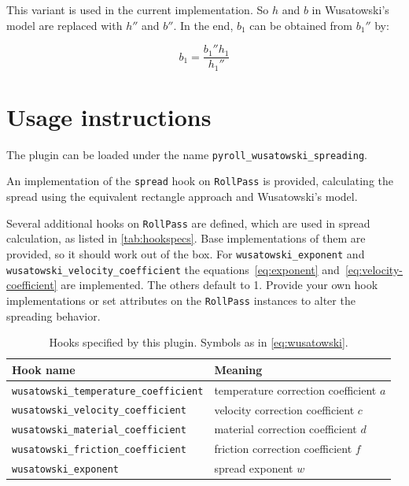 \documentclass[11pt]{PyRollDocs}
\begin{document}
    This variant is used in the current implementation.
    So $h$ and $b$ in Wusatowski's model are replaced with $h''$ and $b''$.
    In the end, $b_1$ can be obtained from $b_1''$ by:

    \[
        b_1 = \frac{b_1'' h_1}{h_1''}
    \]


    \section{Usage instructions}\label{sec:usage-instructions}

    The plugin can be loaded under the name \texttt{pyroll\_wusatowski\_spreading}.

    An implementation of the \lstinline{spread} hook on \lstinline{RollPass} is provided,
    calculating the spread using the equivalent rectangle approach and Wusatowski's model.

    Several additional hooks on \lstinline{RollPass} are defined, which are used in spread calculation, as listed in \autoref{tab:hookspecs}.
    Base implementations of them are provided, so it should work out of the box.
    For \lstinline{wusatowski_exponent} and \lstinline{wusatowski_velocity_coefficient} the equations~\ref{eq:exponent} and~\ref{eq:velocity-coefficient} are implemented.
    The others default to \num{1}.
    Provide your own hook implementations or set attributes on the \lstinline{RollPass} instances to alter the spreading behavior.

    \begin{table}
        \centering
        \caption{Hooks specified by this plugin. Symbols as in \autoref{eq:wusatowski}.}
        \label{tab:hookspecs}
        \begin{tabular}{ll}
            \toprule
            Hook name                                     & Meaning                                \\
            \midrule
            \texttt{wusatowski\_temperature\_coefficient} & temperature correction coefficient $a$ \\
            \texttt{wusatowski\_velocity\_coefficient}    & velocity correction coefficient $c$    \\
            \texttt{wusatowski\_material\_coefficient}    & material correction coefficient $d$    \\
            \texttt{wusatowski\_friction\_coefficient}    & friction correction coefficient $f$    \\
            \texttt{wusatowski\_exponent}                 & spread exponent $w$                    \\
            \bottomrule
        \end{tabular}
    \end{table}

    \printbibliography
\end{document}
